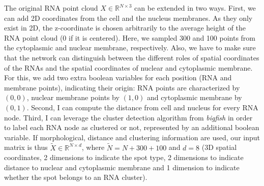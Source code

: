 
The original \ac{RNA} point cloud $X \in \mathbb{R}^{N \times 3}$ can be extended in two ways.
First, we can add 2D coordinates from the cell and the nucleus membranes.
As they only exist in 2D, the z-coordinate is chosen arbitrarily to the average height of the \ac{RNA} point cloud (0 if it is centered).
Here, we sampled 300 and 100 points from the cytoplasmic and nuclear membrane, respectively.
Also, we have to make sure that the network can distinguish between the different roles of spatial coordinates of the \ac{RNA}s and the spatial coordinates of nuclear and cytoplasmic membrane.
For this, we add two extra boolean variables for each position (\ac{RNA} and membrane points), indicating their origin: \ac{RNA} points are characterized by $(0,0)$, nuclear membrane points by $(1,0)$ and cytoplasmic membrane by $(0,1)$.
Second, I can compute the distance from cell and nucleus for every \ac{RNA} node.
Third, I can leverage the cluster detection algorithm from \emph{bigfish} in order to label each \ac{RNA} node as clustered or not, represented by an additional boolean variable.
If morphological, distance and clustering information are used, our input matrix is thus $\tilde{X} \in \mathbb{R}^{N \times d}$, where $\tilde{N} = N + 300 + 100$ and $d = 8$ (3D spatial coordinates, 2 dimensions to indicate the spot type, 2 dimensions to indicate distance to nuclear and cytoplasmic membrane and 1 dimension to indicate whether the spot belongs to an \ac{RNA} cluster).

